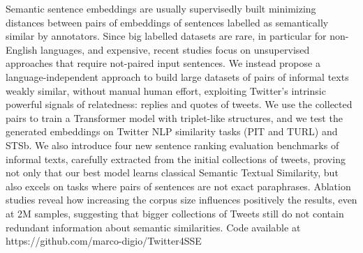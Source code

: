 Semantic sentence embeddings are usually supervisedly built minimizing distances between pairs of embeddings of sentences labelled as semantically similar by annotators. Since big labelled datasets are rare, in particular for non-English languages, and expensive, recent studies focus on unsupervised approaches that require not-paired input sentences. We instead propose a language-independent approach to build large datasets of pairs of informal texts weakly similar, without manual human effort, exploiting Twitter's intrinsic powerful signals of relatedness: replies and quotes of tweets. We use the collected pairs to train a Transformer model with triplet-like structures, and we test the generated embeddings on Twitter NLP similarity tasks (PIT and TURL) and STSb. We also introduce four new sentence ranking evaluation benchmarks of informal texts, carefully extracted from the initial collections of tweets, proving not only that our best model learns classical Semantic Textual Similarity, but also excels on tasks where pairs of sentences are not exact paraphrases. Ablation studies reveal how increasing the corpus size influences positively the results, even at 2M samples, suggesting that bigger collections of Tweets still do not contain redundant information about semantic similarities. Code available at https://github.com/marco-digio/Twitter4SSE
